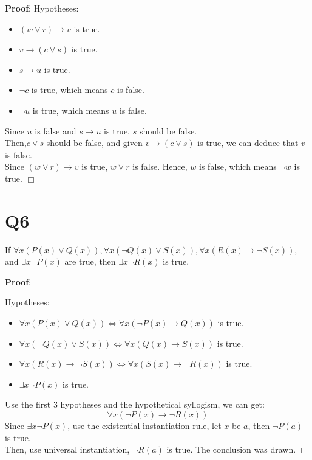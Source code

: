 \documentclass[11pt]{article}
\newenvironment{qparts}{\begin{enumerate}[{(}a{)}]}{\end{enumerate}}
\def\endproofmark{$\Box$}
\newenvironment{proof}{\par{\bf Proof}:}{\endproofmark\smallskip}
\begin{document}
\begin{qparts}
\begin{proof}
        Hypotheses:
        \begin{itemize}
            
            \item $(w \lor r)\to v$ is true.
            \item $v \to (c \lor s)$ is true.
            \item $s \to u$ is true.
            \item $\lnot c$ is true, which means $c$ is false.
            \item $\lnot u$ is true, which means $u$ is false.
        \end{itemize}
        Since $u$ is false and $s \to u$ is true, $s$ should be false.\\
        Then,$c \lor s$ should be false, and given $v \to (c \lor s)$ is true,
        we can deduce that $v$ is false.\\
        Since $(w \lor r)\to v$ is true, $w \lor r$ is false. Hence, $w$ is false, which means $\lnot w$ is true.
    \end{proof} 
\end{qparts}

\section*{Q6}
If $\forall x(P(x)\lor Q(x)),
\forall x(\lnot Q(x)\lor S(x)),
\forall x(R(x)\to \lnot S(x))$, 
and $\exists x\lnot P(x)$ are true, 
then $\exists x\lnot R(x)$ is true.
\begin{proof}
    
    Hypotheses:
    \begin{itemize}
        
        \item $\forall x(P(x)\lor Q(x))\iff\forall x(\lnot P(x)\to Q(x))$ is true.
        \item $\forall x(\lnot Q(x)\lor S(x))\iff\forall x(Q(x)\to S(x))$ is true.
        \item $\forall x(R(x)\to \lnot S(x))\iff\forall x(S(x)\to \lnot R(x))$ is true.
        \item $\exists x\lnot P(x)$ is true.
    \end{itemize}
    Use the first 3 hypotheses and the hypothetical syllogism, we can get:
    \begin{equation*}
      \forall x(\lnot P(x)\to \lnot R(x))
    \end{equation*}
    Since $\exists x\lnot P(x)$, use the existential instantiation rule, let $x$
    be $a$, then $\lnot P(a)$ is true.\\
    Then, use universal instantiation, $\lnot R(a)$ is true. 
    The conclusion was drawn.
\end{proof}
\end{document}
